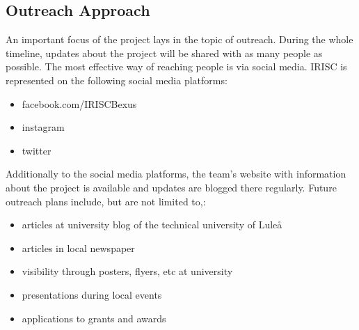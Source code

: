 
\subsection{Outreach Approach}
An important focus of the project lays in the topic of outreach. During the whole timeline, updates about the project will be shared with as many people as possible. The most effective way of reaching people is via social media. IRISC is represented on the following social media platforms:
\begin{itemize}
	\item facebook.com/IRISCBexus
	\item instagram
	\item twitter
\end{itemize}
Additionally to the social media platforms, the team's website with information about the project is available and updates are blogged there regularly.\newline\newline
Future outreach plans include, but are not limited to,:
\begin{itemize}
	\item articles at university blog of the technical university of Lule\aa
	\item articles in local newspaper
	\item visibility through posters, flyers, etc at university
	\item presentations during local events
	\item applications to grants and awards
\end{itemize}

